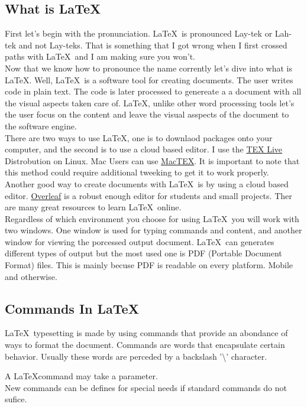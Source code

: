 \documentclass[12pt]{book}
\begin{document}
\subsection{What is \LaTeX \ }
First let's begin with the pronunciation. \LaTeX \ is pronounced Lay-tek or Lah-tek and not Lay-teks. 
That is something that I got wrong when I first crossed paths with \LaTeX \ and I am making sure you won't.\\
Now that we know how to pronounce the name corrently let's dive into what is \LaTeX. Well, \LaTeX \ is a software tool 
for creating documents. The user writes code in plain text. The code is later processed to genereate a 
a document with all the visual aspects taken care of. \LaTeX, unlike other word processing tools 
let's the user focus on the content and leave the visual asspects of the document to the software engine.\\
There are two ways to use \LaTeX, one is to downlaod packages onto your computer, and the second is to use a 
cloud based editor.
I use the \href{https://tug.org/texlive/}{TEX Live} Distrobution on Linux. Mac Users can use
\href{https://www.tug.org/mactex/}{MacTEX}. It is important to note that this method could 
require additional tweeking to get it to work properly.\\
Another good way to create documents with \LaTeX \ is by using a cloud based editor. 
\href{https://www.overleaf.com}{Overleaf} is a robust enough editor for students and small projects.
Ther are many great resources to learn \LaTeX \ online. \\
Regardless of which environment you choose for using \LaTeX \ you will work with two windows. 
One window is used for typing commands and content, and another window for viewing the porcessed output document.
\LaTeX \ can generates different types of output but the most used one is PDF (Portable Document Format) files. 
This is mainly becuse PDF is readable on every platform. Mobile and otherwise.\\

\subsection{Commands In \LaTeX \ }
\LaTeX \ typesetting is made by using commands that provide an abondance of ways to format the document. 
Commands are words that encapsulate certain behavior. Usually these words are perceded by a backslash 
'\textbackslash'  character.\par
A \LaTeX command may take a parameter. \\
New commands can be defines for special needs if standard commands do not sufice.
\end{document}
